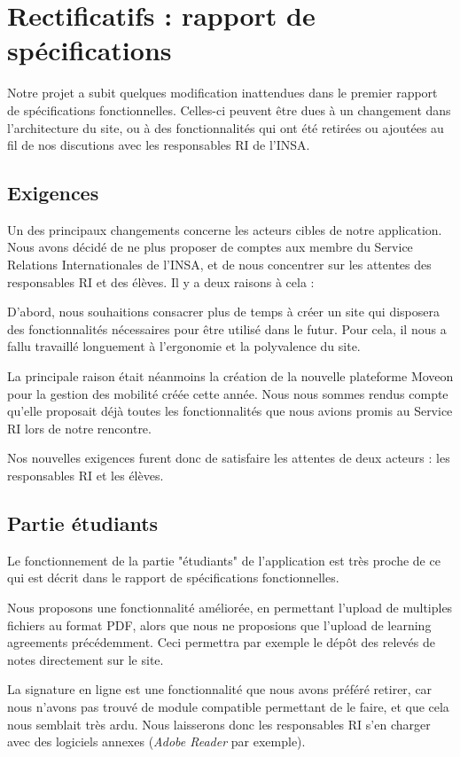 \chapter{Rectificatifs : rapport de spécifications}

Notre projet a subit quelques modification inattendues dans le premier rapport de spécifications fonctionnelles.  Celles-ci peuvent être dues à un changement dans l'architecture du site, ou à des fonctionnalités qui ont été retirées ou ajoutées au fil de nos discutions avec les responsables RI de l'INSA.

\section{Exigences}
Un des principaux changements concerne les acteurs cibles de notre application. Nous avons décidé de ne plus proposer de comptes aux membre du Service Relations Internationales de l'INSA, et de nous concentrer sur les attentes des responsables RI et des élèves. Il y a deux raisons à cela :

D'abord, nous souhaitions consacrer plus de temps à créer un site qui disposera des fonctionnalités nécessaires pour être utilisé dans le futur. Pour cela, il nous a fallu travaillé longuement à l'ergonomie et la polyvalence du site.

La principale raison était néanmoins la création de la nouvelle plateforme Moveon pour la gestion des mobilité créée cette année. Nous nous sommes rendus compte qu'elle proposait déjà toutes les fonctionnalités que nous avions promis au Service RI lors de notre rencontre.

Nos nouvelles exigences furent donc de satisfaire les attentes de deux acteurs : les responsables RI et les élèves.
\section{Partie étudiants}
Le fonctionnement de la partie "étudiants" de l'application est très proche de ce qui est décrit dans le rapport de spécifications fonctionnelles.

 Nous proposons une fonctionnalité améliorée, en permettant l'upload de multiples fichiers au format PDF, alors que nous ne proposions que l'upload de learning agreements précédemment. Ceci permettra par exemple le dépôt des relevés de notes directement sur le site.

La signature en ligne est une fonctionnalité que nous avons préféré retirer, car nous n'avons pas trouvé de module compatible permettant de le faire, et que cela nous semblait très ardu. Nous laisserons donc les responsables RI s'en charger avec des logiciels annexes (\textit{Adobe Reader} par exemple).
\smallbreak

